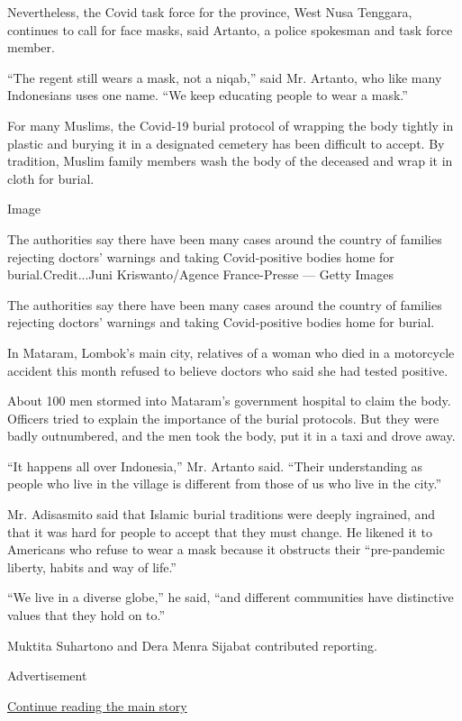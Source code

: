 Nevertheless, the Covid task force for the province, West Nusa Tenggara,
continues to call for face masks, said Artanto, a police spokesman and
task force member.

``The regent still wears a mask, not a niqab,'' said Mr. Artanto, who
like many Indonesians uses one name. ``We keep educating people to wear
a mask.''

For many Muslims, the Covid-19 burial protocol of wrapping the body
tightly in plastic and burying it in a designated cemetery has been
difficult to accept. By tradition, Muslim family members wash the body
of the deceased and wrap it in cloth for burial.

Image

The authorities say there have been many cases around the country of
families rejecting doctors' warnings and taking Covid-positive bodies
home for burial.Credit...Juni Kriswanto/Agence France-Presse --- Getty
Images

The authorities say there have been many cases around the country of
families rejecting doctors' warnings and taking Covid-positive bodies
home for burial.

In Mataram, Lombok's main city, relatives of a woman who died in a
motorcycle accident this month refused to believe doctors who said she
had tested positive.

About 100 men stormed into Mataram's government hospital to claim the
body. Officers tried to explain the importance of the burial protocols.
But they were badly outnumbered, and the men took the body, put it in a
taxi and drove away.

``It happens all over Indonesia,'' Mr. Artanto said. ``Their
understanding as people who live in the village is different from those
of us who live in the city.''

Mr. Adisasmito said that Islamic burial traditions were deeply
ingrained, and that it was hard for people to accept that they must
change. He likened it to Americans who refuse to wear a mask because it
obstructs their ``pre-pandemic liberty, habits and way of life.''

``We live in a diverse globe,'' he said, ``and different communities
have distinctive values that they hold on to.''

Muktita Suhartono and Dera Menra Sijabat contributed reporting.

Advertisement

\protect\hyperlink{after-bottom}{Continue reading the main story}

